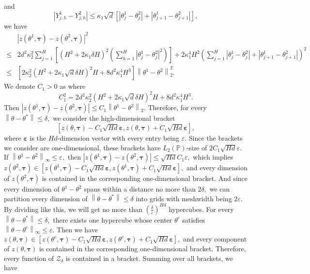 \documentclass{article}
\numberwithin{equation}{section}
\theoremstyle{plain}
\theoremstyle{definition}
\theoremstyle{remark}
\begin{document}
and 
\begin{equation*}
    \left|Y^1_{j,h} - Y^2_{j,h}\right| \leq \kappa_1 \sqrt{d} \left[ \left|\theta_j^1 - \theta_j^2\right| + \left|\theta_{j+1}^1 - \theta_{j+1}^2\right| \right],
\end{equation*}
we have
\begin{align*}
&\left|z\left(\theta^{1}, \boldsymbol{\tau}\right)-z\left(\theta^{2}, \boldsymbol{\tau}\right)\right|^2 \\
\leq & 2 d^2 \kappa_2^2 \sum_{j=1}^H \left[\left(H^2 + 2\kappa_1\delta H\right)^2 \left(\sum_{h=1}^H\left|\theta^1_j - \theta^2_j \right|^2\right)\right] + 2 \kappa_1^4 H^2 \left(\sum_{j=1}^H \left|\theta_j^1 - \theta_j^2\right| + \left|\theta_{j+1}^1 - \theta_{j+1}^2\right| \right)^2\\
\leq & \left[2 \kappa_2^2 \left(H^2 + 2\kappa_1\sqrt{d} \delta H\right)^2 H + 8 d^2 \kappa_1^4 H^3\right] \left\|\theta^1 - \theta^2\right\|_2^2.
\end{align*}
We denote $C_1 > 0$ as 
where
\begin{equation}\label{definition_C}
    C_1^2 = 2 d^2 \kappa_2^2 \left(H^2 + 2\kappa_1\sqrt{d}\delta H\right)^2 H + 8 d^2 \kappa_1^4 H^3.
\end{equation}
Then $\left|z\left(\theta^{1}, \boldsymbol{\tau}\right)-z\left(\theta^{2}, \boldsymbol{\tau}\right)\right| \leq C_1 \left\|\theta^1 - \theta^2\right\|_2.$ Therefore, for every $\left\|\theta - \theta^* \right\| \leq \delta,$ we consider the high-dimensional bracket 
    $$[z(\theta,\boldsymbol{\tau}) - C_1 \sqrt{Hd} \boldsymbol{\varepsilon}, z(\theta,\boldsymbol{\tau}) + C_1 \sqrt{Hd} \boldsymbol{\varepsilon} ],$$ 
    where $\boldsymbol{\varepsilon}$ is the $Hd$-dimension vector with every entry being $\varepsilon.$ Since the brackets we consider are one-dimensional, these brackets have $L_2(\mathbb{P})$-size of $2 C_1 \sqrt{Hd} \varepsilon.$ If $\left\|\theta^1 - \theta^2\right\|_{\infty} \leq \varepsilon,$ then $\left|z\left(\theta^{1}, \boldsymbol{\tau}\right)-z\left(\theta^{2}, \boldsymbol{\tau}\right)\right| \leq \sqrt{Hd} C_1 \varepsilon,$ which implies $z(\theta^2,\boldsymbol{\tau}) \in [z(\theta^1,\boldsymbol{\tau}) - C_1 \sqrt{Hd} \boldsymbol{\varepsilon}, z(\theta^1,\boldsymbol{\tau}) + C_1 \sqrt{Hd} \boldsymbol{\varepsilon}],$ and every dimension of $z(\theta^2,\boldsymbol{\tau})$ is contained in the corresponding one-dimensional bracket. And since every dimension of $\theta^1 - \theta^2$ spans within a distance no more than $2\delta,$ we can partition every dimension of $\left\|\theta - \theta^* \right\| \leq \delta$ into grids with meshwidth being $2\varepsilon.$ By dividing like this, we will get no more than $(\frac{\delta}{\varepsilon})^{Hd}$ hypercubes. For every $\left\|\theta - \theta^* \right\| \leq \delta,$ there exists one hypercube whose center $\theta^c$ satisfies $\left\|\theta - \theta^c\right\|_{\infty} \leq \varepsilon.$ Then we have $z(\theta,\boldsymbol{\tau}) \in [z(\theta^c,\boldsymbol{\tau}) - C_1 \sqrt{Hd} \boldsymbol{\varepsilon}, z(\theta^c,\boldsymbol{\tau}) + C_1 \sqrt{Hd} \boldsymbol{\varepsilon}],$ and every component of $z(\theta,\boldsymbol{\tau})$ is contained in the corresponding one-dimensional bracket. Therefore, every function of $\mathcal{Z}_{\delta}$ is contained in a bracket. Summing over all brackets, we have
\end{document}
